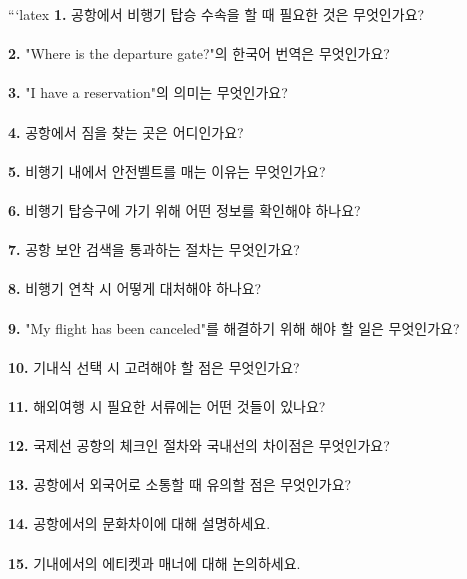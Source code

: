 \documentclass[fleqn]{article}
\begin{document}
      
        ```latex
\noindent \textbf{1.} 공항에서 비행기 탑승 수속을 할 때 필요한 것은 무엇인가요? \\\\
\noindent \textbf{2.} "Where is the departure gate?"의 한국어 번역은 무엇인가요? \\\\
\noindent \textbf{3.} "I have a reservation"의 의미는 무엇인가요? \\\\
\noindent \textbf{4.} 공항에서 짐을 찾는 곳은 어디인가요? \\\\
\noindent \textbf{5.} 비행기 내에서 안전벨트를 매는 이유는 무엇인가요? \\\\

\noindent \textbf{6.} 비행기 탑승구에 가기 위해 어떤 정보를 확인해야 하나요? \\\\
\noindent \textbf{7.} 공항 보안 검색을 통과하는 절차는 무엇인가요? \\\\
\noindent \textbf{8.} 비행기 연착 시 어떻게 대처해야 하나요? \\\\
\noindent \textbf{9.} "My flight has been canceled"를 해결하기 위해 해야 할 일은 무엇인가요? \\\\
\noindent \textbf{10.} 기내식 선택 시 고려해야 할 점은 무엇인가요? \\\\

\noindent \textbf{11.} 해외여행 시 필요한 서류에는 어떤 것들이 있나요? \\\\
\noindent \textbf{12.} 국제선 공항의 체크인 절차와 국내선의 차이점은 무엇인가요? \\\\
\noindent \textbf{13.} 공항에서 외국어로 소통할 때 유의할 점은 무엇인가요? \\\\
\noindent \textbf{14.} 공항에서의 문화차이에 대해 설명하세요. \\\\
\noindent \textbf{15.} 기내에서의 에티켓과 매너에 대해 논의하세요. \\\\
\end{document}
